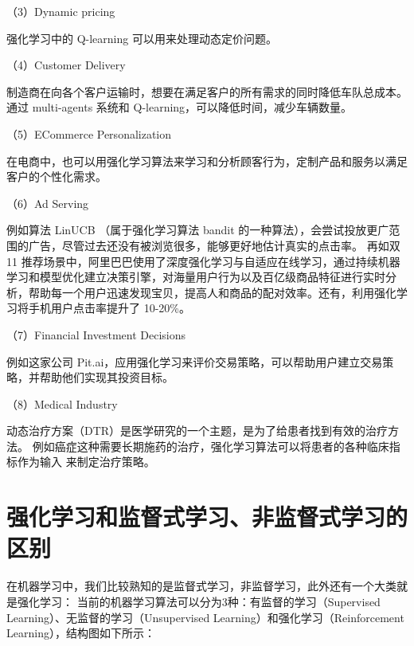 （3）Dynamic pricing

强化学习中的 Q-learning 可以用来处理动态定价问题。

（4）Customer Delivery

制造商在向各个客户运输时，想要在满足客户的所有需求的同时降低车队总成本。通过
multi-agents 系统和 Q-learning，可以降低时间，减少车辆数量。

（5）ECommerce Personalization

在电商中，也可以用强化学习算法来学习和分析顾客行为，定制产品和服务以满足客户的个性化需求。

（6）Ad Serving

例如算法 LinUCB （属于强化学习算法 bandit
的一种算法），会尝试投放更广范围的广告，尽管过去还没有被浏览很多，能够更好地估计真实的点击率。
再如双 11
推荐场景中，阿里巴巴使用了深度强化学习与自适应在线学习，通过持续机器学习和模型优化建立决策引擎，对海量用户行为以及百亿级商品特征进行实时分析，帮助每一个用户迅速发现宝贝，提高人和商品的配对效率。还有，利用强化学习将手机用户点击率提升了
10-20\%。

（7）Financial Investment Decisions

例如这家公司
Pit.ai，应用强化学习来评价交易策略，可以帮助用户建立交易策略，并帮助他们实现其投资目标。

（8）Medical Industry

动态治疗方案（DTR）是医学研究的一个主题，是为了给患者找到有效的治疗方法。
例如癌症这种需要长期施药的治疗，强化学习算法可以将患者的各种临床指标作为输入
来制定治疗策略。

\section{强化学习和监督式学习、非监督式学习的区别}\label{ux5f3aux5316ux5b66ux4e60ux548cux76d1ux7763ux5f0fux5b66ux4e60ux975eux76d1ux7763ux5f0fux5b66ux4e60ux7684ux533aux522b}

在机器学习中，我们比较熟知的是监督式学习，非监督学习，此外还有一个大类就是强化学习：
当前的机器学习算法可以分为3种：有监督的学习（Supervised
Learning）、无监督的学习（Unsupervised
Learning）和强化学习（Reinforcement Learning），结构图如下所示：


